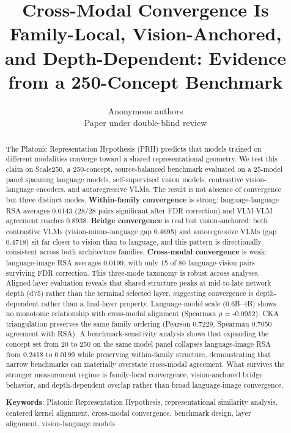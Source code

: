 \documentclass[10pt]{article}
\title{Cross-Modal Convergence Is Family-Local, Vision-Anchored, and
Depth-Dependent: Evidence from a 250-Concept Benchmark}
\author{\name Anonymous authors \\ \addr Paper under double-blind review}
\begin{document}
\maketitle

\begin{abstract}
The Platonic Representation Hypothesis (PRH) predicts that models
trained on different modalities converge toward a shared
representational geometry. We test this claim on Scale250, a
250-concept, source-balanced benchmark evaluated on a 25-model panel
spanning language models, self-supervised vision models, contrastive
vision-language encoders, and autoregressive VLMs. The result is not
absence of convergence but three distinct modes. \textbf{Within-family
convergence} is strong: language-language RSA averages 0.6143 (28/28
pairs significant after FDR correction) and VLM-VLM agreement reaches
0.8938. \textbf{Bridge convergence} is real but vision-anchored: both
contrastive VLMs (vision-minus-language gap 0.4695) and autoregressive
VLMs (gap 0.4718) sit far closer to vision than to language, and this
pattern is directionally consistent across both architecture families.
\textbf{Cross-modal convergence} is weak: language-image RSA averages
0.0199, with only 15 of 80 language-vision pairs surviving FDR
correction. This three-mode taxonomy is robust across analyses.
Aligned-layer evaluation reveals that shared structure peaks at
mid-to-late network depth (d75) rather than the terminal selected layer,
suggesting convergence is depth-dependent rather than a final-layer
property. Language-model scale (0.6B--4B) shows no monotonic
relationship with cross-modal alignment (Spearman \(\rho\) = -0.0952).
CKA triangulation preserves the same family ordering (Pearson 0.7229,
Spearman 0.7050 agreement with RSA). A benchmark-sensitivity analysis
shows that expanding the concept set from 20 to 250 on the same model
panel collapses language-image RSA from 0.2418 to 0.0199 while
preserving within-family structure, demonstrating that narrow benchmarks
can materially overstate cross-modal agreement. What survives the
stronger measurement regime is family-local convergence, vision-anchored
bridge behavior, and depth-dependent overlap rather than broad
language-image convergence.

\textbf{Keywords}: Platonic Representation Hypothesis, representational
similarity analysis, centered kernel alignment, cross-modal convergence,
benchmark design, layer alignment, vision-language models
\end{abstract}
\end{document}
